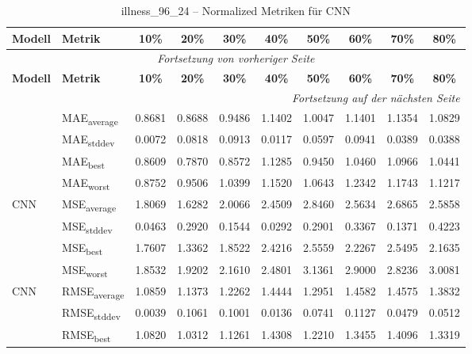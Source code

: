 {\small
\begin{longtable}{l l c c c c c c c c}
    \toprule
    \textbf{Modell} & \textbf{Metrik} & \textbf{10\%} & \textbf{20\%} & \textbf{30\%} & \textbf{40\%} & \textbf{50\%} & \textbf{60\%} & \textbf{70\%} & \textbf{80\%} \\
    \midrule
    \endfirsthead
    \multicolumn{10}{c}{\textit{Fortsetzung von vorheriger Seite}} \\
    \toprule
    \textbf{Modell} & \textbf{Metrik} & \textbf{10\%} & \textbf{20\%} & \textbf{30\%} & \textbf{40\%} & \textbf{50\%} & \textbf{60\%} & \textbf{70\%} & \textbf{80\%} \\
    \midrule
    \endhead
    \midrule
    \multicolumn{10}{r}{\textit{Fortsetzung auf der nächsten Seite}} \\
    \midrule
    \endfoot
    \bottomrule
    \caption{illness_96_24 -- Normalized Metriken für CNN}
    \label{tab:illness_96_24_normalized_cnn}
    \endlastfoot
\multirow{4}{*}{CNN} & MAE\textsubscript{average} & 0.8681 & 0.8688 & 0.9486 & 1.1402 & 1.0047 & 1.1401 & 1.1354 & 1.0829 \\
 & MAE\textsubscript{stddev} & 0.0072 & 0.0818 & 0.0913 & 0.0117 & 0.0597 & 0.0941 & 0.0389 & 0.0388 \\
 & MAE\textsubscript{best} & 0.8609 & 0.7870 & 0.8572 & 1.1285 & 0.9450 & 1.0460 & 1.0966 & 1.0441 \\
 & MAE\textsubscript{worst} & 0.8752 & 0.9506 & 1.0399 & 1.1520 & 1.0643 & 1.2342 & 1.1743 & 1.1217 \\
\cmidrule(lr){2-10}
\multirow{4}{*}{CNN} & MSE\textsubscript{average} & 1.8069 & 1.6282 & 2.0066 & 2.4509 & 2.8460 & 2.5634 & 2.6865 & 2.5858 \\
 & MSE\textsubscript{stddev} & 0.0463 & 0.2920 & 0.1544 & 0.0292 & 0.2901 & 0.3367 & 0.1371 & 0.4223 \\
 & MSE\textsubscript{best} & 1.7607 & 1.3362 & 1.8522 & 2.4216 & 2.5559 & 2.2267 & 2.5495 & 2.1635 \\
 & MSE\textsubscript{worst} & 1.8532 & 1.9202 & 2.1610 & 2.4801 & 3.1361 & 2.9000 & 2.8236 & 3.0081 \\
\cmidrule(lr){2-10}
\multirow{4}{*}{CNN} & RMSE\textsubscript{average} & 1.0859 & 1.1373 & 1.2262 & 1.4444 & 1.2951 & 1.4582 & 1.4575 & 1.3832 \\
 & RMSE\textsubscript{stddev} & 0.0039 & 0.1061 & 0.1001 & 0.0136 & 0.0741 & 0.1127 & 0.0479 & 0.0512 \\
 & RMSE\textsubscript{best} & 1.0820 & 1.0312 & 1.1261 & 1.4308 & 1.2210 & 1.3455 & 1.4096 & 1.3319 \\

\end{longtable}}
